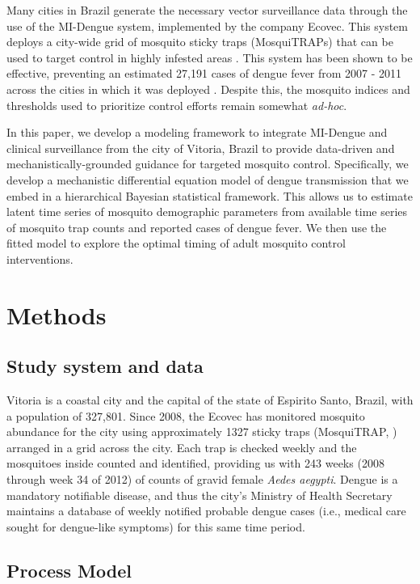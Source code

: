 \documentclass[10pt,letterpaper]{article}
\begin{document}
Many cities in Brazil generate the necessary vector surveillance data through the use of the MI-Dengue system, implemented by the company Ecovec.
This system deploys a city-wide grid of mosquito sticky traps (MosquiTRAPs) that can be used to target control in highly infested areas \cite{Eiras2009}.
This system has been shown to be effective, preventing an estimated 27,191 cases of dengue fever from 2007 - 2011 across the cities in which it was deployed \cite{Pepin2013}.
Despite this, the mosquito indices and thresholds used to prioritize control efforts remain somewhat \emph{ad-hoc}.

In this paper, we develop a modeling framework to integrate MI-Dengue and clinical surveillance from the city of Vitoria, Brazil to provide data-driven and mechanistically-grounded guidance for targeted mosquito control.
Specifically, we develop a mechanistic differential equation model of dengue transmission that we embed in a hierarchical Bayesian statistical framework.
This allows us to estimate latent time series of mosquito demographic parameters from available time series of mosquito trap counts and reported cases of dengue fever.
We then use the fitted model to explore the optimal timing of adult mosquito control interventions.

\section*{Methods}

\subsection*{Study system and data}

Vitoria is a coastal city and the capital of the state of Espirito Santo, Brazil, with a population of 327,801.
Since 2008, the Ecovec has monitored mosquito abundance for the city using approximately 1327 sticky traps (MosquiTRAP, \cite{Eiras2009}) arranged in a grid across the city.
Each trap is checked weekly and the mosquitoes inside counted and identified, providing us with 243 weeks (2008 through week 34 of 2012) of counts of gravid female \emph{Aedes aegypti}.
Dengue is a mandatory notifiable disease, and thus the city's Ministry of Health Secretary maintains a database of weekly notified probable dengue cases (i.e., medical care sought for dengue-like symptoms) for this same time period.

\subsection*{Process Model}
\end{document}
